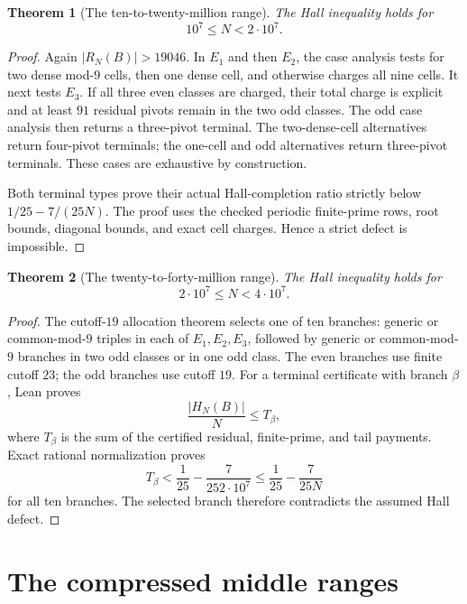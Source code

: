 \documentclass[11pt]{article}
\newtheorem{theorem}{Theorem}[section]
\theoremstyle{definition}
\newcommand{\RN}{R_N}
\newcommand{\TenMillion}{10^7}
\newcommand{\TwentyMillion}{2\cdot10^7}
\newcommand{\FortyMillion}{4\cdot10^7}
\begin{document}
\begin{theorem}[The ten-to-twenty-million range]
\label{prop:ten-million-interval-close}
The Hall inequality holds for
\[
 \TenMillion\leq N<\TwentyMillion.
\]
\end{theorem}

\begin{proof}
Again $|\RN(B)|>19046$.  In $E_1$ and then $E_2$, the case analysis tests for
two dense mod-$9$ cells, then one dense cell, and otherwise charges all nine
cells.  It next tests $E_3$.  If all three even classes are charged, their
total charge is explicit and at least $91$ residual pivots remain in the two
odd classes.  The odd case analysis then returns a three-pivot terminal.  The
two-dense-cell alternatives return four-pivot terminals; the one-cell and
odd alternatives return three-pivot terminals.  These cases are exhaustive
by construction.

Both terminal types prove their actual Hall-completion ratio strictly below
$1/25-7/(25N)$.  The proof uses the checked periodic finite-prime rows,
root bounds, diagonal bounds, and exact cell charges.  Hence a strict defect
is impossible.
\end{proof}

\begin{theorem}[The twenty-to-forty-million range]
\label{prop:twenty-million-interval-close}
The Hall inequality holds for
\[
 \TwentyMillion\leq N<\FortyMillion.
\]
\end{theorem}

\begin{proof}
The cutoff-$19$ allocation theorem selects one of ten branches:
generic or common-mod-$9$ triples in each of $E_1,E_2,E_3$, followed by
generic or common-mod-$9$ branches in two odd classes or in one odd class.
The even branches use finite cutoff $23$; the odd branches use cutoff $19$.
For a terminal certificate with branch $\beta$, Lean proves
\[
 \frac{|H_N(B)|}{N}\leq T_\beta,
\]
where $T_\beta$ is the sum of the certified residual, finite-prime, and tail
payments.  Exact rational normalization proves
\[
 T_\beta<\frac1{25}-\frac7{25\TwentyMillion}
 \leq\frac1{25}-\frac7{25N}
\]
for all ten branches.  The selected branch therefore contradicts the
assumed Hall defect.
\end{proof}

\section{The compressed middle ranges}
\end{document}
